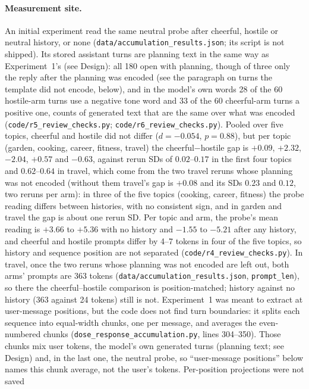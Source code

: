 \documentclass[11pt,a4paper]{article}
\begin{document}
\paragraph{Measurement site.} An initial experiment read the same
neutral probe after cheerful, hostile or neutral history, or none
(\texttt{data/accumulation\_results.json}; its script is not shipped).
Its stored assistant turns are planning text in the same way as
Experiment~1's (see Design): all 180 open with planning, though of three only the reply after the planning was encoded (see the paragraph on turns the template did not encode, below), and in the model's own words 28 of the 60 hostile-arm turns use a negative tone word and 33 of the 60 cheerful-arm turns a positive one, counts of generated text that are the same over what was encoded (\texttt{code/r5\_review\_checks.py}; \texttt{code/r6\_review\_checks.py}).
Pooled over five topics, cheerful and hostile did not differ
($d{=}-0.054$, $p{=}0.88$), but per topic (garden, cooking, career,
fitness, travel) the cheerful$-$hostile gap is $+0.09$, $+2.32$, $-2.04$,
$+0.57$ and $-0.63$, against rerun SDs of $0.02$--$0.17$ in the first four
topics and $0.62$--$0.64$ in travel, which come from the two travel reruns whose planning was not encoded (without them travel's gap is $+0.08$ and its SDs $0.23$ and $0.12$, two reruns per arm): in three of the five topics (cooking,
career, fitness) the probe reading differs between histories, with no
consistent sign, and in garden and travel the gap is about one rerun SD.
Per topic and arm, the probe's mean reading is $+3.66$ to $+5.36$
with no history and $-1.55$ to $-5.21$ after any history, and cheerful and
hostile prompts differ by 4--7 tokens in four of the five topics, so
history and sequence position are not separated
(\texttt{code/r4\_review\_checks.py}). In travel, once the two reruns
whose planning was not encoded are left out, both arms' prompts are 363
tokens (\texttt{data/accumulation\_results.json}, \texttt{prompt\_len}),
so there the cheerful--hostile comparison is position-matched; history
against no history (363 against 24 tokens) still is not. Experiment~1 was meant to
extract at user-message positions, but the code does not find turn
boundaries: it splits each sequence into equal-width chunks, one per
message, and averages the even-numbered chunks
(\texttt{dose\_response\_accumulation.py}, lines 304--350). Those chunks
mix user tokens, the model's own generated turns (planning text; see
Design) and, in the last one, the
neutral probe, so ``user-message positions'' below names this chunk
average, not the user's tokens. Per-position projections were not saved
\end{document}
